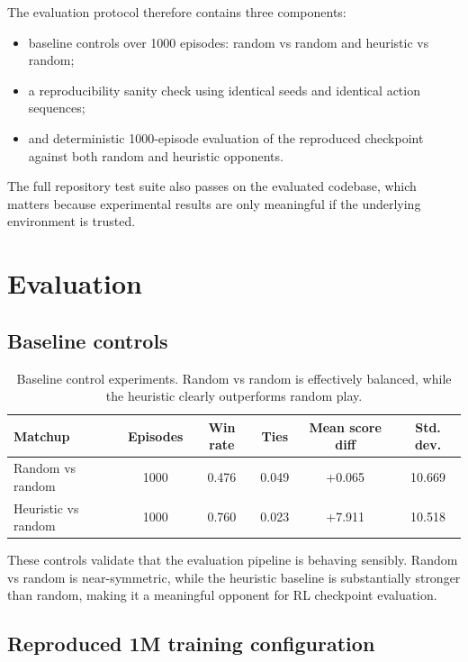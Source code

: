 \documentclass[10pt]{article}
\begin{document}
The evaluation protocol therefore contains three components:
\begin{itemize}
  \item baseline controls over 1000 episodes: random vs random and heuristic vs random;
  \item a reproducibility sanity check using identical seeds and identical action sequences;
  \item and deterministic 1000-episode evaluation of the reproduced checkpoint against both random and heuristic opponents.
\end{itemize}

The full repository test suite also passes on the evaluated codebase, which matters because experimental results are only meaningful if the underlying environment is trusted.

\section{Evaluation}

\subsection{Baseline controls}

\begin{table}[H]
\centering
\begin{tabularx}{\textwidth}{@{}lccccc@{}}
\toprule
Matchup & Episodes & Win rate & Ties & Mean score diff & Std. dev. \\
\midrule
Random vs random & 1000 & 0.476 & 0.049 & +0.065 & 10.669 \\
Heuristic vs random & 1000 & 0.760 & 0.023 & +7.911 & 10.518 \\
\bottomrule
\end{tabularx}
\caption{Baseline control experiments. Random vs random is effectively balanced, while the heuristic clearly outperforms random play.}
\label{tab:baseline-controls}
\end{table}

These controls validate that the evaluation pipeline is behaving sensibly. Random vs random is near-symmetric, while the heuristic baseline is substantially stronger than random, making it a meaningful opponent for RL checkpoint evaluation.

\subsection{Reproduced 1M training configuration}
\end{document}
